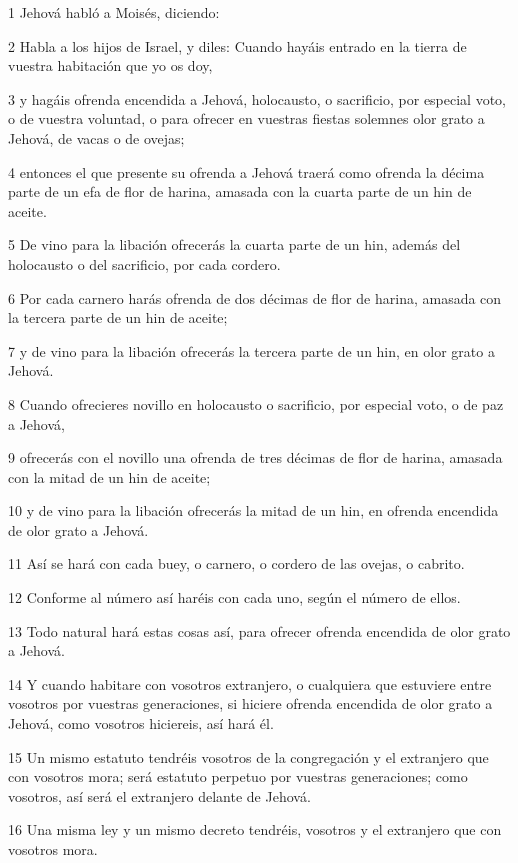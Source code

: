 \par 1 Jehová habló a Moisés, diciendo:
\par 2 Habla a los hijos de Israel, y diles: Cuando hayáis entrado en la tierra de vuestra habitación que yo os doy,
\par 3 y hagáis ofrenda encendida a Jehová, holocausto, o sacrificio, por especial voto, o de vuestra voluntad, o para ofrecer en vuestras fiestas solemnes olor grato a Jehová, de vacas o de ovejas;
\par 4 entonces el que presente su ofrenda a Jehová traerá como ofrenda la décima parte de un efa   de flor de harina, amasada con la cuarta parte de un hin de aceite.
\par 5 De vino para la libación ofrecerás la cuarta parte de un hin, además del holocausto o del sacrificio, por cada cordero.
\par 6 Por cada carnero harás ofrenda de dos décimas de flor de harina, amasada con la tercera parte de un hin   de aceite;
\par 7 y de vino para la libación ofrecerás la tercera parte de un hin,  en olor grato a Jehová.
\par 8 Cuando ofrecieres novillo en holocausto o sacrificio, por especial voto, o de paz a Jehová,
\par 9 ofrecerás con el novillo una ofrenda de tres décimas de flor de harina, amasada con la mitad de un hin   de aceite;
\par 10 y de vino para la libación ofrecerás la mitad de un hin, en ofrenda encendida de olor grato a Jehová.
\par 11 Así se hará con cada buey, o carnero, o cordero de las ovejas, o cabrito.
\par 12 Conforme al número así haréis con cada uno, según el número de ellos.
\par 13 Todo natural hará estas cosas así, para ofrecer ofrenda encendida de olor grato a Jehová.
\par 14 Y cuando habitare con vosotros extranjero, o cualquiera que estuviere entre vosotros por vuestras generaciones, si hiciere ofrenda encendida de olor grato a Jehová, como vosotros hiciereis, así hará él.
\par 15 Un mismo estatuto tendréis vosotros de la congregación y el extranjero que con vosotros mora; será estatuto perpetuo por vuestras generaciones; como vosotros, así será el extranjero delante de Jehová.
\par 16 Una misma ley y un mismo decreto tendréis, vosotros y el extranjero que con vosotros mora.
